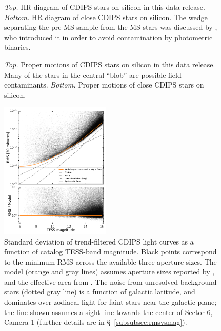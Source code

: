 \documentclass[12pt,twocolumn,tighten]{aastex62}
\begin{document}
\begin{figure}[!ht]
	\vspace{-0.8cm}
	\vspace{-0.8cm}
	\caption{
		{\it Top.} HR diagram of CDIPS stars on silicon in this
		data release.  {\it Bottom.} HR diagram of close CDIPS stars on
		silicon. The wedge separating the pre-MS sample from the MS
		stars was discussed by \citet{zari_3d_2018}, who introduced it in
		order to avoid contamination by photometric binaries.
	}
	\label{fig:hrd}
\end{figure}

\begin{figure}[!t]
	\vspace{-0.8cm}
	\vspace{-0.8cm}
	\caption{
		{\it Top.} Proper motions of CDIPS stars on silicon in this
		data release.  Many of the stars in the central ``blob'' are possible
		field-contaminants.
		{\it Bottom.} Proper motions of close CDIPS stars
		on silicon.
	}
	\label{fig:propermotions}
\end{figure}

\begin{figure}[!t]
	\begin{center}
		\leavevmode
		\includegraphics[width=0.47\textwidth]{rms_vs_mag.pdf}
	\end{center}
	\vspace{-0.5cm}
	\caption{
    Standard deviation of trend-filtered CDIPS light curves as a
    function of catalog TESS-band magnitude.  Black points correspond
    to the minimum RMS across the available three aperture sizes.  The
    model (orange and gray lines) assumes aperture sizes reported by
    \citet{Sullivan_et_al_2015}, and the effective area from
    \citet{vanderspek_2018}.  The noise from unresolved background
    stars (dotted gray line) is a function of galactic latitude, and
    dominates over zodiacal light for faint stars near the galactic
    plane; the line shown assumes a sight-line towards the center of
    Sector 6, Camera 1 (further details are in
    \S~\ref{subsubsec:rmsvsmag}).
		\label{fig:rms_vs_mag}
	}
\end{figure}
\end{document}
